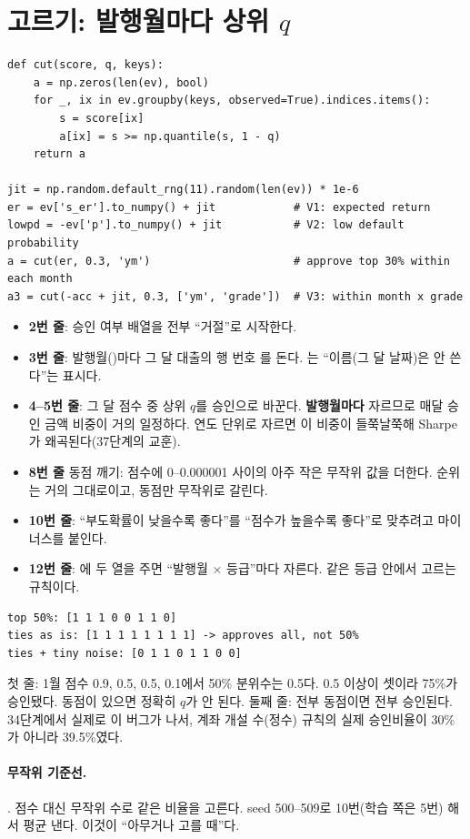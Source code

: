 \section{고르기: 발행월마다 상위 $q$}
\begin{lstlisting}
def cut(score, q, keys):
    a = np.zeros(len(ev), bool)
    for _, ix in ev.groupby(keys, observed=True).indices.items():
        s = score[ix]
        a[ix] = s >= np.quantile(s, 1 - q)
    return a

jit = np.random.default_rng(11).random(len(ev)) * 1e-6
er = ev['s_er'].to_numpy() + jit            # V1: expected return
lowpd = -ev['p'].to_numpy() + jit           # V2: low default probability
a = cut(er, 0.3, 'ym')                      # approve top 30% within each month
a3 = cut(-acc + jit, 0.3, ['ym', 'grade'])  # V3: within month x grade
\end{lstlisting}
\begin{itemize}[leftmargin=*]
\item \textbf{2번 줄}: 승인 여부 배열을 전부 ``거절''로 시작한다.
\item \textbf{3번 줄}: 발행월()마다 그 달 대출의 행 번호 를 돈다. \ft{_}는 ``이름(그 달 날짜)은 안 쓴다''는 표시다.
\item \textbf{4--5번 줄}: 그 달 점수 중 상위 $q$를 승인으로 바꾼다. \textbf{발행월마다} 자르므로 매달 승인 금액 비중이 거의 일정하다. 연도 단위로 자르면 이 비중이 들쭉날쭉해 Sharpe가 왜곡된다(37단계의 교훈).
\item \textbf{8번 줄} 동점 깨기: 점수에 0--0.000001 사이의 아주 작은 무작위 값을 더한다. 순위는 거의 그대로이고, 동점만 무작위로 갈린다.
\item \textbf{10번 줄}: ``부도확률이 낮을수록 좋다''를 ``점수가 높을수록 좋다''로 맞추려고 마이너스를 붙인다.
\item \textbf{12번 줄}: 에 두 열을 주면 ``발행월 \ensuremath{\times} 등급''마다 자른다. 같은 등급 안에서 고르는 규칙이다.
\end{itemize}
\begin{workout}
\begin{lstlisting}[style=out]
top 50%: [1 1 1 0 0 1 1 0]
ties as is: [1 1 1 1 1 1 1 1] -> approves all, not 50%
ties + tiny noise: [0 1 1 0 1 1 0 0]
\end{lstlisting}
 첫 줄: 1월 점수 0.9, 0.5, 0.5, 0.1에서 50\% 분위수는 0.5다. 0.5 이상이 셋이라 75\%가 승인됐다. 동점이 있으면 정확히 $q$가 안 된다.
 둘째 줄: 전부 동점이면 전부 승인된다. 34단계에서 실제로 이 버그가 나서, 계좌 개설 수(정수) 규칙의 실제 승인비율이 30\%가 아니라 39.5\%였다.
\end{workout}

\paragraph{무작위 기준선.} . 점수 대신 무작위 수로 같은 비율을 고른다. seed 500--509로 10번(학습 쪽은 5번) 해서 평균 낸다. 이것이 ``아무거나 고를 때''다.
